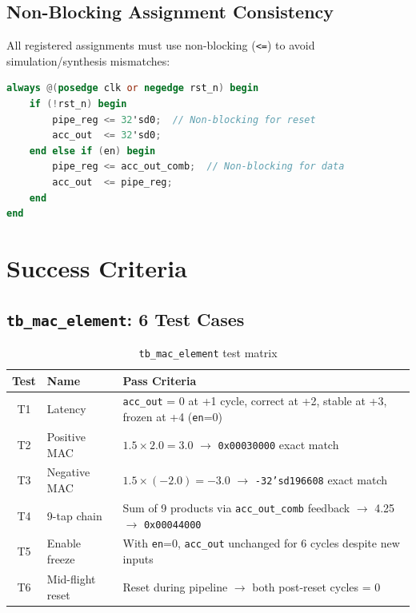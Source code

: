 \documentclass[11pt,a4paper]{report}
\newcommand{\signal}[1]{\texttt{\color{datacolor}#1}}
\begin{document}
\subsection{Non-Blocking Assignment Consistency}

All registered assignments must use non-blocking (\texttt{<=}) to avoid simulation/synthesis mismatches:

\begin{lstlisting}[language=Verilog, caption={Proper non-blocking usage in FSM}]
always @(posedge clk or negedge rst_n) begin
    if (!rst_n) begin
        pipe_reg <= 32'sd0;  // Non-blocking for reset
        acc_out  <= 32'sd0;
    end else if (en) begin
        pipe_reg <= acc_out_comb;  // Non-blocking for data
        acc_out  <= pipe_reg;
    end
end
\end{lstlisting}

\section{Success Criteria}

\subsection{\texttt{tb\_mac\_element}: 6 Test Cases}

\begin{table}[h]
\centering
\begin{tabular}{@{}clp{8cm}@{}}
\toprule
\textbf{Test} & \textbf{Name} & \textbf{Pass Criteria} \\
\midrule
T1 & Latency & \signal{acc\_out} = 0 at +1 cycle, correct at +2, stable at +3, frozen at +4 (\signal{en}=0) \\
T2 & Positive MAC & $1.5 \times 2.0 = 3.0$ $\rightarrow$ \texttt{0x00030000} exact match \\
T3 & Negative MAC & $1.5 \times (-2.0) = -3.0$ $\rightarrow$ \texttt{-32'sd196608} exact match \\
T4 & 9-tap chain & Sum of 9 products via \signal{acc\_out\_comb} feedback $\rightarrow$ 4.25 $\rightarrow$ \texttt{0x00044000} \\
T5 & Enable freeze & With \signal{en}=0, \signal{acc\_out} unchanged for 6 cycles despite new inputs \\
T6 & Mid-flight reset & Reset during pipeline $\rightarrow$ both post-reset cycles = 0 \\
\bottomrule
\end{tabular}
\caption{\texttt{tb\_mac\_element} test matrix}
\end{table}
\end{document}
